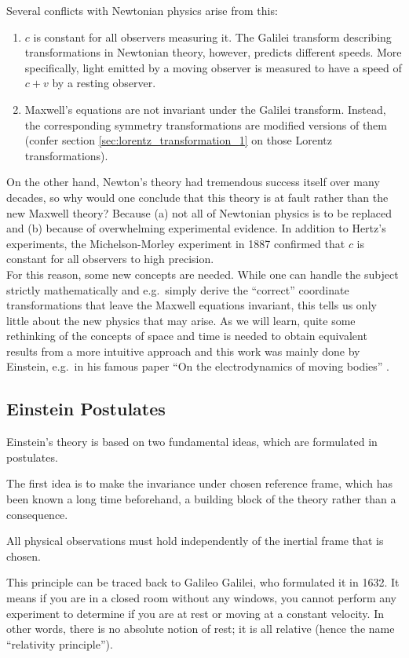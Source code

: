 \documentclass[../relativity_main.tex]{subfiles}
\begin{document}
Several conflicts with Newtonian physics arise from this:
\begin{enumerate}
	\item $c$ is constant for all observers measuring it. The Galilei transform describing transformations in Newtonian theory, however, predicts different speeds. More specifically, light emitted by a moving observer is measured to have a speed of $c + v$ by a resting observer.


	\item Maxwell's equations are not invariant under the Galilei transform. Instead, the corresponding symmetry transformations are modified versions of them (confer section \ref{sec:lorentz_transformation_1} on those Lorentz transformations).
\end{enumerate}

On the other hand, Newton's theory had tremendous success itself over many decades, so why would one conclude that this theory is at fault rather than the new Maxwell theory? Because (a) not all of Newtonian physics is to be replaced and (b) because of overwhelming experimental evidence. In addition to Hertz's experiments, the Michelson-Morley experiment in 1887 confirmed that $c$ is constant for all observers to high precision.\\


For this reason, some new concepts are needed. While one can handle the subject strictly mathematically and e.g.~simply derive the \enquote{correct} coordinate transformations that leave the Maxwell equations invariant, this tells us only little about the new physics that may arise. As we will learn, quite some rethinking of the concepts of space and time is needed to obtain equivalent results from a more intuitive approach and this work was mainly done by Einstein, e.g.~in his famous paper \enquote{On the electrodynamics of moving bodies} \cite{Einstein_1905}.



		\subsection{Einstein Postulates}
Einstein's theory is based on two fundamental ideas, which are formulated in postulates.

The first idea is to make the invariance under chosen reference frame, which has been known a long time beforehand, a building block of the theory rather than a consequence.
\begin{post}
	All physical observations must hold independently of the inertial frame that is chosen.
\end{post}
This principle can be traced back to Galileo Galilei, who formulated it in 1632. It means if you are in a closed room without any windows, you cannot perform any experiment to determine if you are at rest or moving at a constant velocity. In other words, there is no absolute notion of rest; it is all relative (hence the name \enquote{relativity principle}).\\
\end{document}
